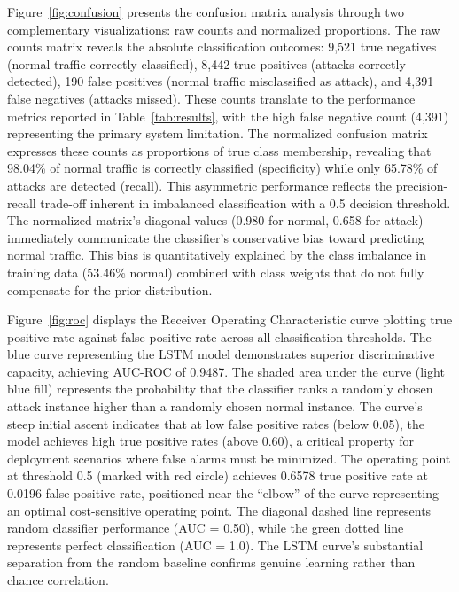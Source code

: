 \documentclass[12pt,a4paper]{report}
\begin{document}
Figure~\ref{fig:confusion} presents the confusion matrix analysis through two complementary visualizations: raw counts and normalized proportions. The raw counts matrix reveals the absolute classification outcomes: 9,521 true negatives (normal traffic correctly classified), 8,442 true positives (attacks correctly detected), 190 false positives (normal traffic misclassified as attack), and 4,391 false negatives (attacks missed). These counts translate to the performance metrics reported in Table~\ref{tab:results}, with the high false negative count (4,391) representing the primary system limitation. The normalized confusion matrix expresses these counts as proportions of true class membership, revealing that 98.04\% of normal traffic is correctly classified (specificity) while only 65.78\% of attacks are detected (recall). This asymmetric performance reflects the precision-recall trade-off inherent in imbalanced classification with a 0.5 decision threshold. The normalized matrix's diagonal values (0.980 for normal, 0.658 for attack) immediately communicate the classifier's conservative bias toward predicting normal traffic. This bias is quantitatively explained by the class imbalance in training data (53.46\% normal) combined with class weights that do not fully compensate for the prior distribution.

Figure~\ref{fig:roc} displays the Receiver Operating Characteristic curve plotting true positive rate against false positive rate across all classification thresholds. The blue curve representing the LSTM model demonstrates superior discriminative capacity, achieving AUC-ROC of 0.9487. The shaded area under the curve (light blue fill) represents the probability that the classifier ranks a randomly chosen attack instance higher than a randomly chosen normal instance. The curve's steep initial ascent indicates that at low false positive rates (below 0.05), the model achieves high true positive rates (above 0.60), a critical property for deployment scenarios where false alarms must be minimized. The operating point at threshold 0.5 (marked with red circle) achieves 0.6578 true positive rate at 0.0196 false positive rate, positioned near the ``elbow'' of the curve representing an optimal cost-sensitive operating point. The diagonal dashed line represents random classifier performance (AUC = 0.50), while the green dotted line represents perfect classification (AUC = 1.0). The LSTM curve's substantial separation from the random baseline confirms genuine learning rather than chance correlation.
\end{document}
